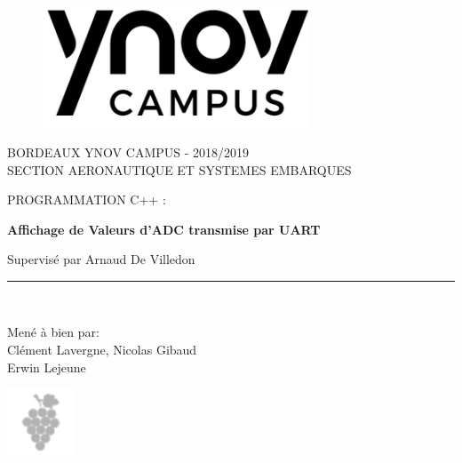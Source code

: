 \documentclass[11pt, french]{article}
\begin{document}
\begin{titlepage}

\begin{center}
\vspace*{-1in}
\begin{figure}[htb]
\begin{center}
\includegraphics[width=8cm]{logo_ynov_campus_rvb.png}
\end{center}
\end{figure}

BORDEAUX YNOV CAMPUS - 2018/2019 \\
\vspace*{0.15in}
SECTION AERONAUTIQUE ET SYSTEMES EMBARQUES \\
\vspace*{0.4in}
\begin{large}
PROGRAMMATION C++ :\\
\end{large}
\vspace*{0.2in}
\begin{Large}
\textbf{Affichage de Valeurs d'ADC transmise par UART} \\
\end{Large}
\vspace*{0.3in}
\begin{large}
Supervisé par Arnaud De Villedon \\
\end{large}
\vspace*{0.3in}
\rule{80mm}{0.1mm}\\
\vspace*{0.1in}
\begin{large}
Mené à bien par: \\
Clément Lavergne, Nicolas Gibaud \\
Erwin Lejeune \\
\end{large}
\includegraphics[width=2cm]{picto_bordeaux_gris.png}
\end{center}
\end{titlepage}
\end{document}
